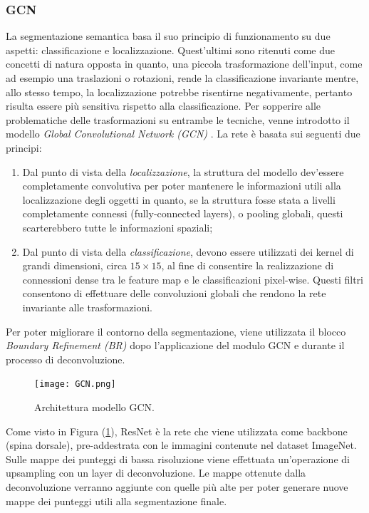 \subsubsection{GCN}
La segmentazione semantica basa il suo principio di funzionamento su due aspetti: 
classificazione e localizzazione. Quest’ultimi sono ritenuti come due concetti 
di natura opposta in quanto, una piccola trasformazione dell’input, come ad 
esempio una traslazioni o rotazioni, rende la classificazione invariante mentre, allo 
stesso tempo, la localizzazione potrebbe risentirne negativamente, pertanto risulta 
essere più sensitiva rispetto alla classificazione. Per sopperire alle problematiche 
delle trasformazioni su entrambe le tecniche, venne introdotto il modello \emph{Global 
Convolutional Network (GCN)} \cite{gcn}. La rete è basata sui seguenti due principi:
\begin{enumerate}
    \item Dal punto di vista della \emph{localizzazione}, la struttura del modello dev’essere 
    completamente convolutiva per poter mantenere le informazioni utili alla 
    localizzazione degli oggetti in quanto, se la struttura fosse stata a livelli 
    completamente connessi (fully-connected layers), o pooling globali, questi 
    scarterebbero tutte le informazioni spaziali;
    \item Dal punto di vista della \emph{classificazione}, devono essere utilizzati dei kernel 
    di grandi dimensioni, circa $15\times 15$, al fine di consentire la realizzazione di 
    connessioni dense tra le feature map e le classificazioni pixel-wise. Questi 
    filtri consentono di effettuare delle convoluzioni globali che rendono la rete 
    invariante alle trasformazioni.
\end{enumerate}
Per poter migliorare il contorno della segmentazione, viene utilizzata il blocco 
\emph{Boundary Refinement (BR)} dopo l’applicazione del modulo GCN e durante 
il processo di deconvoluzione.
\begin{figure}
    \centering
    \texttt{[image: GCN.png]}
    \centering
    \caption{Architettura modello GCN.}
    \label{gcn}
\end{figure}
Come visto in Figura (\ref{gcn}), ResNet è la rete che viene utilizzata come 
backbone (spina dorsale), pre-addestrata con le immagini contenute nel dataset 
ImageNet. Sulle mappe dei punteggi di bassa risoluzione viene effettuata un’operazione 
di upsampling con un layer di deconvoluzione. Le mappe ottenute dalla 
deconvoluzione verranno aggiunte con quelle più alte per poter generare nuove 
mappe dei punteggi utili alla segmentazione finale.

